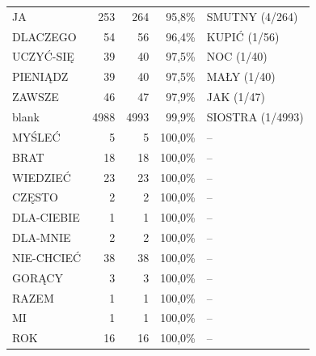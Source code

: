 \documentclass[12pt]{article}
\begin{document}
\begin{longtable}{lrrrl}
JA & 253 & 264 & 95,8\% & SMUTNY (4/264) \\
DLACZEGO & 54 & 56 & 96,4\% & KUPIĆ (1/56) \\
UCZYĆ-SIĘ & 39 & 40 & 97,5\% & NOC (1/40) \\
PIENIĄDZ & 39 & 40 & 97,5\% & MAŁY (1/40) \\
ZAWSZE & 46 & 47 & 97,9\% & JAK (1/47) \\
blank & 4988 & 4993 & 99,9\% & SIOSTRA (1/4993) \\
MYŚLEĆ & 5 & 5 & 100,0\% & -- \\
BRAT & 18 & 18 & 100,0\% & -- \\
WIEDZIEĆ & 23 & 23 & 100,0\% & -- \\
CZĘSTO & 2 & 2 & 100,0\% & -- \\
DLA-CIEBIE & 1 & 1 & 100,0\% & -- \\
DLA-MNIE & 2 & 2 & 100,0\% & -- \\
NIE-CHCIEĆ & 38 & 38 & 100,0\% & -- \\
GORĄCY & 3 & 3 & 100,0\% & -- \\
RAZEM & 1 & 1 & 100,0\% & -- \\
MI & 1 & 1 & 100,0\% & -- \\
ROK & 16 & 16 & 100,0\% & -- \\
\end{longtable}
\end{document}
